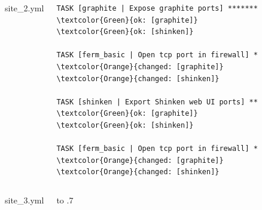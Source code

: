 \documentclass{beamer}
\begin{document}
\begin{frame}[fragile]
\begin{columns}
    \begin{alertblock}{site\_2.yml}
        \footnotesize{
            \inputminted{yaml}{sources/site_2.yml}
        }
    \end{alertblock}
        \scriptsize{
        \begin{Verbatim}[label={Ansible output 1}]
TASK [graphite | Expose graphite ports] *******
\textcolor{Green}{ok: [graphite]}
\textcolor{Green}{ok: [shinken]}

TASK [ferm_basic | Open tcp port in firewall] *
\textcolor{Orange}{changed: [graphite]}
\textcolor{Orange}{changed: [shinken]}

TASK [shinken | Export Shinken web UI ports] **
\textcolor{Green}{ok: [graphite]}
\textcolor{Green}{ok: [shinken]}

TASK [ferm_basic | Open tcp port in firewall] *
\textcolor{Orange}{changed: [graphite]}
\textcolor{Orange}{changed: [shinken]}
        \end{Verbatim}
        }
\end{columns}
\vfill
\begin{center}
\end{center}
\end{frame}

\begin{frame}[fragile]
\begin{columns}
        \begin{block}{site\_3.yml}
        \footnotesize{
            \inputminted[firstline=1, lastline=2]
                        {yaml}{sources/site_3.yml}
            \inputminted[firstline=3, lastline=3,
                        frame=single,
                        framesep=0pt]
                        {yaml}{sources/site_3.yml}
            \inputminted[firstline=4, lastline=6]
                        {yaml}{sources/site_3.yml}
            \inputminted[firstline=7, lastline=7,
                        frame=single,
                        framesep=0pt]
                        {yaml}{sources/site_3.yml}
            \inputminted[firstline=8]
                        {yaml}{sources/site_3.yml}
        }
        \end{block}
        \vbox to .7
\end{columns}
\end{frame}
\end{document}
